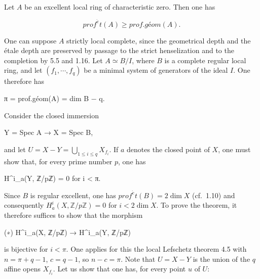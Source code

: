 \documentclass[
]{article}
\newenvironment{Shaded}{}{}
\newcommand{\NormalTok}[1]{#1}
\begin{document}
Let \(A\) be an excellent local ring of characteristic zero. Then one
has

\[
prof^{\acute{e}}t(A) \geqslant prof.géom(A).
\]

One can suppose \(A\) strictly local complete, since the geometrical
depth and the étale depth are preserved by passage to the strict
henselization and to the completion by 5.5 and 1.16. Let
\(A \simeq B/I\), where \(B\) is a complete regular local ring, and let
\((f_{1}, \cdots, f_{q})\) be a minimal system of generators of the
ideal \(I\). One therefore has

\begin{Shaded}
\begin{Highlighting}[]
\NormalTok{π = prof.géom(A) = dim B − q.}
\end{Highlighting}
\end{Shaded}

Consider the closed immersion

\begin{Shaded}
\begin{Highlighting}[]
\NormalTok{Y = Spec A → X = Spec B,}
\end{Highlighting}
\end{Shaded}

and let \(U = X - Y = \bigcup_{1 \leqslant i \leqslant q} X_{f_{i}}\).
If \(a\) denotes the closed point of \(X\), one must show that, for
every prime number \(p\), one has

\begin{Shaded}
\begin{Highlighting}[]
\NormalTok{H\^{}i\_a(Y, ℤ/pℤ) = 0 for i \textless{} π.}
\end{Highlighting}
\end{Shaded}

Since \(B\) is regular excellent, one has
\(prof^{\acute{e}}t(B) = 2 \dim X\) (cf.~1.10) and consequently
\(H^{i}_{a}(X, \mathbb{Z}/p\mathbb{Z}) = 0\) for \(i < 2 \dim X\). To
prove the theorem, it therefore suffices to show that the morphism

\begin{Shaded}
\begin{Highlighting}[]
\NormalTok{(∗) H\^{}i\_a(X, ℤ/pℤ) → H\^{}i\_a(Y, ℤ/pℤ)}
\end{Highlighting}
\end{Shaded}

is bijective for \(i < \pi\). One applies for this the local Lefschetz
theorem 4.5 with \(n = \pi + q - 1\), \(c = q - 1\), so \(n - c = \pi\).
Note that \(U = X - Y\) is the union of the \(q\) affine opens
\(X_{f_{i}}\). Let us show that one has, for every point \(u\) of \(U\):
\end{document}
